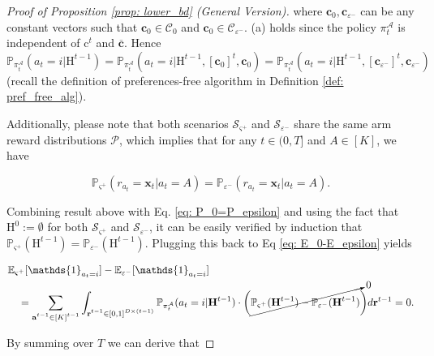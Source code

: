 \begin{proof}[Proof of Proposition \ref{prop: lower_bd} (General Version)]
where $\boldsymbol{c}_0, \boldsymbol{c}_{\varepsilon^{-}}$ can be any constant vectors such that $\boldsymbol{c}_0 \in \mathcal{C}_0$ and $\boldsymbol{c}_0 \in \mathcal{C}_{\varepsilon^{-}}$. (a) holds since the policy $\pi^{\mathcal{A}}_t$ is independent of $\boldsymbol{\mathrm{c}}^{t}$ and $\boldsymbol{\overline{c}}$. Hence 
$
\mathbb{P}_{\pi_t^{\mathcal{A}}} (a_t=i | \boldsymbol{\mathrm{H}}^{t-1})
=
\mathbb{P}_{\pi_t^{\mathcal{A}}} (a_t=i | \boldsymbol{\mathrm{H}}^{t-1}, [\boldsymbol{c}_0]^{t}, \boldsymbol{c}_0)
= \mathbb{P}_{\pi_t^{\mathcal{A}}} (a_t=i | \boldsymbol{\mathrm{H}}^{t-1}, [\boldsymbol{c}_{\varepsilon^{-}}]^{t}, \boldsymbol{c}_{\varepsilon^{-}})$
(recall the definition of preferences-free algorithm in Definition \ref{def: pref_free_alg}).

Additionally, please note that both scenarios $\mathcal{S}_{\varsigma^{+}}$ and $\mathcal{S}_{\varepsilon^{-}}$ share the same arm reward distributions $\mathcal{P}$, which implies that for any $t \in (0,T]$ and $A \in [K]$, we have

\[
\mathbb{P}_{\varsigma^{+}}(r_{a_{t}} = \boldsymbol{x}_{t} | a_{t}=A)
=
\mathbb{P}_{\varepsilon^{-}}(r_{a_{t}} = \boldsymbol{x}_{t} | a_{t}=A).
\]

Combining result above with Eq. \ref{eq: P_0=P_epsilon} and using the fact that $\boldsymbol{\mathrm{H}}^{0}:= \emptyset$ for both  $\mathcal{S}_{\varsigma^{+}}$ and $\mathcal{S}_{\varepsilon^{-}}$, it can be easily verified by induction that 
$\mathbb{P}_{\varsigma^{+}}(\boldsymbol{\mathrm{H}}^{t-1} ) 
= 
\mathbb{P}_{\varepsilon^{-}}(\boldsymbol{\mathrm{H}}^{t-1} )$.
Plugging this back to Eq \ref{eq: E_0-E_epsilon} yields

\begin{equation}
\label{eq: E_0=E_epsilon}
\begin{aligned}
& \mathbb{E}_{\varsigma^{+}}[ \mathds{1}_{a_t = i} ] - \mathbb{E}_{\varepsilon^{-}}[ \mathds{1}_{a_t = i} ] \\
& \quad =
\sum_{\substack{\boldsymbol{\mathrm{a}}^{t-1} \in [K]^{t-1}}} \int_{\substack{\boldsymbol{\mathrm{r}}^{t-1} \in [0,1]^{D \times (t-1)}}}
\mathbb{P}_{\pi_t^{\mathcal{A}}} (a_t=i | \boldsymbol{\mathrm{H}}^{t-1})
\cdot
\bigg(
\cancelto{0}
{
\mathbb{P}_{\varsigma^{+}}(\boldsymbol{\mathrm{H}}^{t-1} )
-
\mathbb{P}_{\varepsilon^{-}}(\boldsymbol{\mathrm{H}}^{t-1} )
}
\bigg )
d\boldsymbol{\mathrm{r}}^{t-1}
= 0.
\end{aligned}
\end{equation}

By summing over $T$ we can derive that 


\end{proof}
